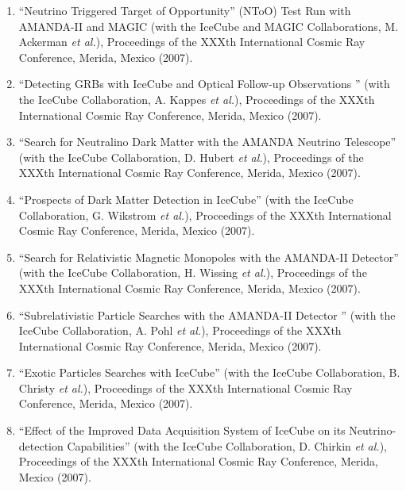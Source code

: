 \begin{enumerate}
\item ``Neutrino Triggered Target of Opportunity'' (NToO)
        Test Run with   AMANDA-II and MAGIC (with the
        IceCube and MAGIC Collaborations,   M. Ackerman {\it
        et al.}), Proceedings of the XXXth International
        Cosmic   Ray Conference, Merida, Mexico (2007).

\item ``Detecting GRBs with IceCube and Optical Follow-up
        Observations  '' (with the IceCube Collaboration, A.
        Kappes {\it et al.}), Proceedings of   the XXXth
        International Cosmic Ray Conference, Merida, Mexico
        (2007).

\item ``Search for Neutralino Dark Matter with the AMANDA
        Neutrino   Telescope'' (with the IceCube
        Collaboration, D. Hubert {\it et al.}),
        Proceedings of the XXXth International Cosmic Ray
        Conference,   Merida, Mexico (2007).

\item ``Prospects of Dark Matter Detection in IceCube''
        (with the IceCube   Collaboration, G. Wikstrom {\it
        et al.}), Proceedings of the XXXth   International
        Cosmic Ray Conference, Merida, Mexico (2007).

\item ``Search for Relativistic Magnetic Monopoles with the
        AMANDA-II   Detector'' (with the IceCube
        Collaboration, H. Wissing {\it et al.}),
        Proceedings of the XXXth International Cosmic Ray
        Conference,   Merida, Mexico (2007).

\item ``Subrelativistic Particle Searches with the AMANDA-II
        Detector  '' (with the IceCube Collaboration, A.
        Pohl {\it et al.}), Proceedings of the   XXXth
        International Cosmic Ray Conference, Merida, Mexico
        (2007).

\item ``Exotic Particles Searches with IceCube'' (with the
        IceCube   Collaboration, B. Christy {\it et al.}),
        Proceedings of the XXXth   International Cosmic Ray
        Conference, Merida, Mexico (2007).

\item ``Effect of the Improved Data Acquisition System of
        IceCube on its   Neutrino-detection Capabilities''
        (with the IceCube Collaboration,   D. Chirkin {\it
        et al.}), Proceedings of the XXXth International
        Cosmic   Ray Conference, Merida, Mexico (2007).


\end{enumerate}
